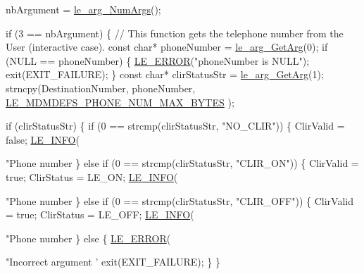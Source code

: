 \begin{DoxyCodeInclude}
{{{{{{    nbArgument = \hyperlink{le__args_8h_a6fbbeb423104e6eb92fe47ef42b7310a}{le\_arg\_NumArgs}();

    \textcolor{keywordflow}{if} (3 == nbArgument)
    \{
        \textcolor{comment}{// This function gets the telephone number from the User (interactive case).}
        \textcolor{keyword}{const} \textcolor{keywordtype}{char}* phoneNumber = \hyperlink{le__args_8h_a5ebca8229facd069785639cb3c1e273a}{le\_arg\_GetArg}(0);
        \textcolor{keywordflow}{if} (NULL == phoneNumber)
        \{
            \hyperlink{le__log_8h_a353590f91b3143a7ba3a416ae5a50c3d}{LE\_ERROR}(\textcolor{stringliteral}{"phoneNumber is NULL"});
            exit(EXIT\_FAILURE);
        \}
        \textcolor{keyword}{const} \textcolor{keywordtype}{char}* clirStatusStr = \hyperlink{le__args_8h_a5ebca8229facd069785639cb3c1e273a}{le\_arg\_GetArg}(1);
        strncpy(DestinationNumber, phoneNumber, \hyperlink{le__mdm_defs__interface_8h_ae6d4a4c7892f14d1e340f8df083d479f}{LE\_MDMDEFS\_PHONE\_NUM\_MAX\_BYTES}
      );

        \textcolor{keywordflow}{if} (clirStatusStr)
        \{
           \textcolor{keywordflow}{if} (0 == strcmp(clirStatusStr, \textcolor{stringliteral}{"NO\_CLIR"}))
           \{
               ClirValid = \textcolor{keyword}{false};
               \hyperlink{le__log_8h_a23e6d206faa64f612045d688cdde5808}{LE\_INFO}(\textcolor{stringliteral}{"Phone number %
           \}
           \textcolor{keywordflow}{else} \textcolor{keywordflow}{if} (0 == strcmp(clirStatusStr, \textcolor{stringliteral}{"CLIR\_ON"}))
           \{
               ClirValid = \textcolor{keyword}{true};
               ClirStatus = LE\_ON;
               \hyperlink{le__log_8h_a23e6d206faa64f612045d688cdde5808}{LE\_INFO}(\textcolor{stringliteral}{"Phone number %
           \}
           \textcolor{keywordflow}{else} \textcolor{keywordflow}{if} (0 == strcmp(clirStatusStr, \textcolor{stringliteral}{"CLIR\_OFF"}))
           \{
               ClirValid = \textcolor{keyword}{true};
               ClirStatus = LE\_OFF;
               \hyperlink{le__log_8h_a23e6d206faa64f612045d688cdde5808}{LE\_INFO}(\textcolor{stringliteral}{"Phone number %
           \}
           \textcolor{keywordflow}{else}
           \{
               \hyperlink{le__log_8h_a353590f91b3143a7ba3a416ae5a50c3d}{LE\_ERROR}(\textcolor{stringliteral}{"Incorrect argument '%
               exit(EXIT\_FAILURE);
           \}
        \}

}}}}}}}}}}
\end{DoxyCodeInclude}
